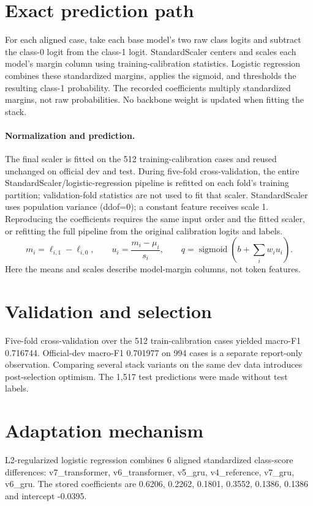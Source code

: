 \documentclass[11pt,a4paper]{article}
\begin{document}
\section{Exact prediction path}
For each aligned case, take each base model's two raw class logits and subtract the class-0 logit from the class-1 logit. StandardScaler centers and scales each model's margin column using training-calibration statistics. Logistic regression combines these standardized margins, applies the sigmoid, and thresholds the resulting class-1 probability. The recorded coefficients multiply standardized margins, not raw probabilities. No backbone weight is updated when fitting the stack.
\paragraph{Normalization and prediction.} The final scaler is fitted on the 512 training-calibration cases and reused unchanged on official dev and test. During five-fold cross-validation, the entire StandardScaler/logistic-regression pipeline is refitted on each fold's training partition; validation-fold statistics are not used to fit that scaler. StandardScaler uses population variance (ddof=0); a constant feature receives scale 1. Reproducing the coefficients requires the same input order and the fitted scaler, or refitting the full pipeline from the original calibration logits and labels.
\[ m_i=\ell_{i,1}-\ell_{i,0},\qquad u_i=\frac{m_i-\mu_i}{s_i},\qquad q=\operatorname{sigmoid}\!\left(b+\sum_i w_i u_i\right). \]
Here the means and scales describe model-margin columns, not token features.

\section{Validation and selection}
Five-fold cross-validation over the 512 train-calibration cases yielded macro-F1 0.716744. Official-dev macro-F1 0.701977 on 994 cases is a separate report-only observation. Comparing several stack variants on the same dev data introduces post-selection optimism. The 1,517 test predictions were made without test labels.
\section{Adaptation mechanism}
L2-regularized logistic regression combines 6 aligned standardized class-score differences: v7\_transformer, v6\_transformer, v5\_gru, v4\_reference, v7\_gru, v6\_gru. The stored coefficients are 0.6206, 0.2262, 0.1801, 0.3552, 0.1386, 0.1386 and intercept -0.0395.
\end{document}

